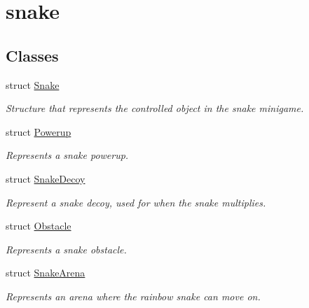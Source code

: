 \hypertarget{group__snake}{}\section{snake}
\label{group__snake}
\subsection*{Classes}
\begin{DoxyCompactItemize}
\item 
struct \mbox{\hyperlink{struct_snake}{Snake}}
\begin{DoxyCompactList}\small\item\em Structure that represents the controlled object in the snake minigame. \end{DoxyCompactList}\item 
struct \mbox{\hyperlink{struct_powerup}{Powerup}}
\begin{DoxyCompactList}\small\item\em Represents a snake powerup. \end{DoxyCompactList}\item 
struct \mbox{\hyperlink{struct_snake_decoy}{Snake\+Decoy}}
\begin{DoxyCompactList}\small\item\em Represent a snake decoy, used for when the snake multiplies. \end{DoxyCompactList}\item 
struct \mbox{\hyperlink{struct_obstacle}{Obstacle}}
\begin{DoxyCompactList}\small\item\em Represents a snake obstacle. \end{DoxyCompactList}\item 
struct \mbox{\hyperlink{struct_snake_arena}{Snake\+Arena}}
\begin{DoxyCompactList}\small\item\em Represents an arena where the rainbow snake can move on. \end{DoxyCompactList}\end{DoxyCompactItemize}
